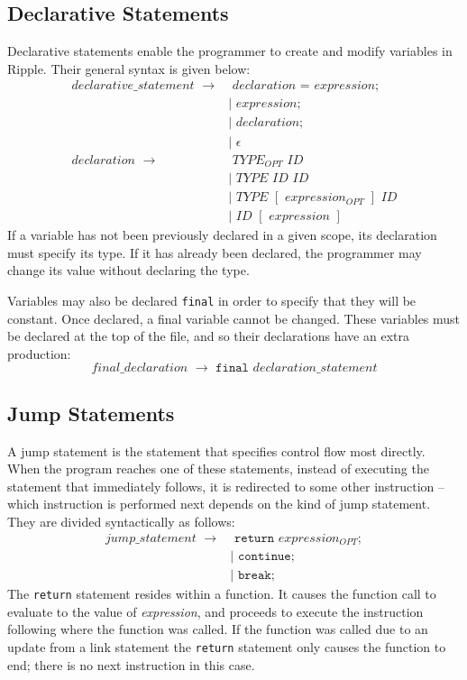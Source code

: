 \documentclass{article}
\newcommand{\code}{\texttt}
\begin{document}
\subsection{Declarative Statements}
Declarative statements enable the programmer to create and modify variables in Ripple. Their general syntax is given below:
\begin{align*}
declarative\_statement\,\,\rightarrow&  \,\,declaration\,\,\code{=}\,\,expression; \\
                                     &| \,\,expression;                            \\
                                     &| \,\,declaration\code{;}                    \\
                                     &| \,\,\epsilon                               \\
declaration\,\,\rightarrow&  \,\,TYPE_{OPT}\,\,ID                         \\
                          &| \,\,TYPE\,\,ID\,\,ID    \\                           
                          &| \,\,TYPE\,\,[\,\,expression_{OPT}\,\,]\,\,ID \\
                          &| \,\,ID\,\,[\,\,expression\,\,]
\end{align*}
If a variable has not been previously declared in a given scope, its declaration must specify its type. If it has already been declared, the programmer may change its value without declaring the type.

Variables may also be declared \code{final} in order to specify that they will be constant. Once declared, a final variable cannot be changed. These variables must be declared at the top of the file, and so their declarations have an extra production:
\[ final\_declaration\,\,\rightarrow\,\,\code{final}\,\,declaration\_statement \]

\subsection{Jump Statements}
A jump statement is the statement that specifies control flow most directly. When the program reaches one of these statements, instead of executing the statement that immediately follows, it is redirected to some other instruction -- which instruction is performed next depends on the kind of jump statement. They are divided syntactically as follows:
\begin{align*}
jump\_statement\,\,\rightarrow&  \,\,\code{return}\,\,expression_{OPT}; \\
                              &| \,\,\code{continue};                   \\
                              &| \,\,\code{break};
\end{align*}
The \code{return} statement resides within a function. It causes the function call to evaluate to the value of \emph{expression}, and proceeds to execute the instruction following where the function was called. If the function was called due to an update from a link statement the \code{return} statement only causes the function to end; there is no next instruction in this case.
\end{document}
